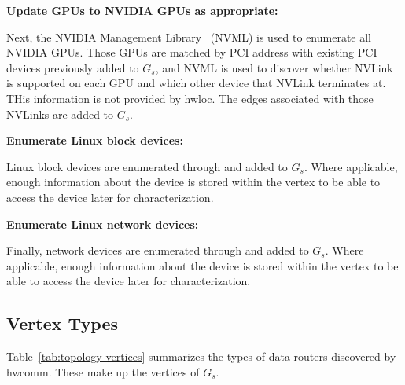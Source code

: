 
\textbf{Update GPUs to NVIDIA GPUs as appropriate:}

Next, the NVIDIA Management Library~\cite{nvidia2017nvml} (NVML) is used to enumerate all NVIDIA GPUs.
Those GPUs are matched by PCI address with existing PCI devices previously added to $G_s$, and NVML is used to discover whether NVLink is supported on each GPU and which other device that NVLink terminates at.
THis information is not provided by hwloc.
The edges associated with those NVLinks are added to $G_s$.


\textbf{Enumerate Linux block devices:}

Linux block devices are enumerated through  and added to $G_s$.
Where applicable, enough information about the device is stored within the vertex to be able to access the device later for characterization.

\textbf{Enumerate Linux network devices:}

Finally, network devices are enumerated through  and added to $G_s$.
Where applicable, enough information about the device is stored within the vertex to be able to access the device later for characterization.

\subsection{Vertex Types}
\label{sec:system-vertices}

Table~\ref{tab:topology-vertices} summarizes the types of data routers discovered by hwcomm.
These make up the vertices of $G_s$.

